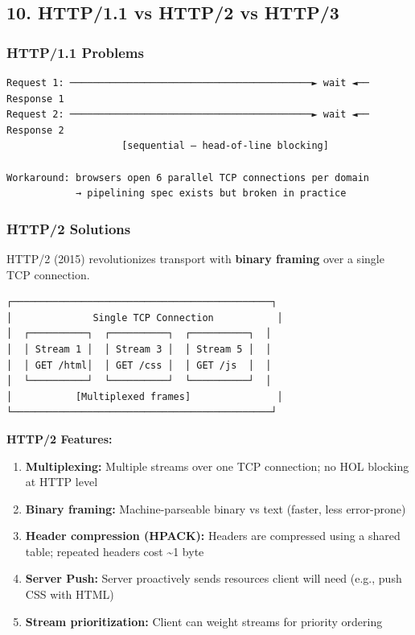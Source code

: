 \documentclass[11pt]{article}
\providecommand{\tightlist}{\setlength{\itemsep}{1pt}\setlength{\parskip}{0pt}}
\begin{document}
\subsection{10. HTTP/1.1 vs HTTP/2 vs HTTP/3}\label{10-http11-vs-http2-vs-http3}

\subsubsection{HTTP/1.1 Problems}\label{http11-problems}

\setcodelang{}

\begin{verbatim}
Request 1: ──────────────────────────────────────────► wait ◄── Response 1
Request 2: ──────────────────────────────────────────► wait ◄── Response 2
                    [sequential — head-of-line blocking]

Workaround: browsers open 6 parallel TCP connections per domain
            → pipelining spec exists but broken in practice
\end{verbatim}

\subsubsection{HTTP/2 Solutions}\label{http2-solutions}

HTTP/2 (2015) revolutionizes transport with \textbf{binary framing} over a single TCP connection.

\setcodelang{}

\begin{verbatim}
┌─────────────────────────────────────────────┐
│              Single TCP Connection           │
│  ┌──────────┐  ┌──────────┐  ┌──────────┐  │
│  │ Stream 1 │  │ Stream 3 │  │ Stream 5 │  │
│  │ GET /html│  │ GET /css │  │ GET /js  │  │
│  └──────────┘  └──────────┘  └──────────┘  │
│           [Multiplexed frames]               │
└─────────────────────────────────────────────┘
\end{verbatim}

\textbf{HTTP/2 Features:}

\begin{enumerate}
\def\labelenumi{\arabic{enumi}.}
\tightlist
\item
  \textbf{Multiplexing:} Multiple streams over one TCP connection; no HOL blocking at HTTP level
\item
  \textbf{Binary framing:} Machine-parseable binary vs text (faster, less error-prone)
\item
  \textbf{Header compression (HPACK):} Headers are compressed using a shared table; repeated headers cost \textasciitilde1 byte
\item
  \textbf{Server Push:} Server proactively sends resources client will need (e.g., push CSS with HTML)
\item
  \textbf{Stream prioritization:} Client can weight streams for priority ordering
\end{enumerate}
\end{document}
